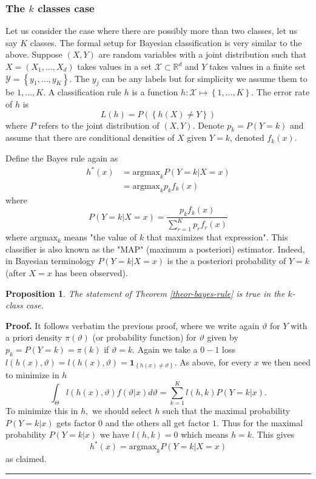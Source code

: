 \documentclass[11pt,twoside]{article}%
\theoremstyle{change}
\newtheorem{proposition}[theorem]{Proposition}
\newenvironment{proof}[1][Proof]{\textbf{#1.} }{\ \rule{0.5em}{0.5em}}
\begin{document}
\subsubsection{The $k$ classes case}

Let us consider the case where there are possibly more than two classes, let
us say $K$ classes. The formal setup for Bayesian classification is very
similar to the above. Suppose $(X,Y)$ are random variables with a joint
distribution such that $X=(X_{1},\ldots,X_{d})$ takes values in a set
$\mathcal{X}\subset\mathbb{R}^{d}$ and $Y$ takes values in a finite set
$\mathcal{Y}=\left\{  y_{1},\ldots,y_{K}\right\}  $. The $y_{j}$ can be any
labels but for simplicity we assume them to be $1,\ldots,K$. A classification
rule $h$ is a function $h:\mathcal{X\mapsto}\left\{  1,\ldots,K\right\}  $.
The error rate of $h$ is
\[
L(h)=P\left(  \left\{  h(X)\neq Y\right\}  \right)
\]
where $P$ refers to the joint distribution of $(X,Y)$. Denote $p_{k}=P\left(
Y=k\right)  $ and assume that there are conditional densities of $X$ given
$Y=k$, denoted $f_{k}(x)$.

Define the Bayes rule again as
\begin{align*}
h^{\ast}(x)  & =\text{argmax}_{k}P\left(  Y=k|X=x\right) \\
& =\text{argmax}_{k}p_{k}f_{k}(x)
\end{align*}
where
\[
P\left(  Y=k|X=x\right)  =\frac{p_{k}f_{k}(x)}{\sum_{r=1}^{K}p_{r}f_{r}(x)}%
\]
where argmax$_{k}$ means "the value of $k$ that maximizes that expression".
This classifier is also known as the "MAP" (maximum a posteriori) estimator.
Indeed, in Bayesian terminology $P\left(  Y=k|X=x\right)  $ is the a
posteriori probability of $Y=k$ (after $X=x$ has been observed).

\begin{proposition}
The statement of Theorem \ref{theor-bayes-rule} is true in the $k$-class case.
\end{proposition}

\begin{proof}
It follows verbatim the previous proof, where we write again $\vartheta$ for
$Y$ with a priori density $\pi(\vartheta)$ (or probability function) for
$\vartheta$ given by $p_{k}=P\left(  Y=k\right)  =\pi(k)$ if $\vartheta=k$.
Again we take a $0-1$ loss $l(h(x),\vartheta)=l(h(x),\vartheta)=\mathbf{1}%
_{\left\{  h(x)\neq\vartheta\right\}  }$. As above, for every $x$ we then need
to minimize in $h$
\[
\int_{\Theta}l(h(x),\vartheta)f(\vartheta|x)d\vartheta=\sum_{k=1}%
^{K}l(h,k)P\left(  Y=k|x\right)  .
\]
To minimize this in $h,$ we should select $h$ such that the maximal
probability $P\left(  Y=k|x\right)  $ gets factor $0$ and the others all get
factor $1.$ Thus for the maximal probability $P\left(  Y=k|x\right)  $ we have
$l(h,k)=0$ which means $h=k$. This gives%
\[
h^{\ast}(x)=\text{argmax}_{k}P\left(  Y=k|X=x\right)
\]
as claimed.
\end{proof}
\end{document}
